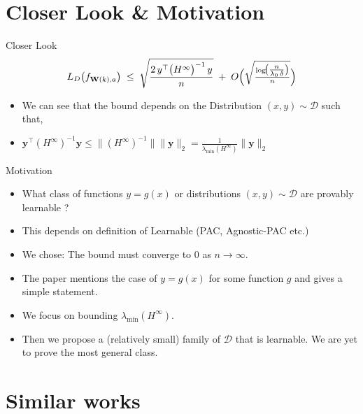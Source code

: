 \documentclass[serif, aspectratio=169]{beamer}
\begin{document}
\section{Closer Look \& Motivation}
\begin{frame}{Closer Look}
	\[
	L_D\bigl(f_{\mathbf{W}(k),a}\bigr)
	\;\le\;
	\sqrt{\frac{2\,y^\top \bigl(H^\infty\bigr)^{-1}\,y}{n}}
	\;+\;
	O\Bigl(\sqrt{\tfrac{\log\!\bigl(\tfrac{n}{\lambda_0\,\delta}\bigr)}{n}}\Bigr)
	\]
	\begin{itemize}
		
		\item We can see that the bound depends on the Distribution \((x,y) \sim \mathcal{D}\) such that,
		
		\item \(\mathbf{y}^\top( H^\infty)^{-1} \mathbf{y} \leq \|(H^\infty)^{-1}\| \|\mathbf{y}\|_2 = \frac{1}{\lambda_{\min}(H^{\infty})} \|\mathbf{y}\|_2 \)
		
		
		
	\end{itemize}
	
\end{frame}

\begin{frame}{Motivation}
	\begin{itemize}
		
		\item What class of functions \(y=g(x)\) or distributions \((x,y) \sim \mathcal{D}\) are provably learnable ?
		\item This depends on definition of Learnable (PAC, Agnostic-PAC etc.)
		\item We chose: The bound must converge to \(0\) as \(n \to \infty\).
		
		\item The paper mentions the case of \(y=g(x)\) for some function \(g\) and gives a simple statement.
		
		\item We focus on bounding \(\lambda_{\min}(H^{\infty})\).
		
		\item Then we propose a (relatively small) family of \(\mathcal{D}\) that is learnable. We are yet to prove the most general class.
		
	\end{itemize}
\end{frame}


\section{Similar works}
\end{document}
